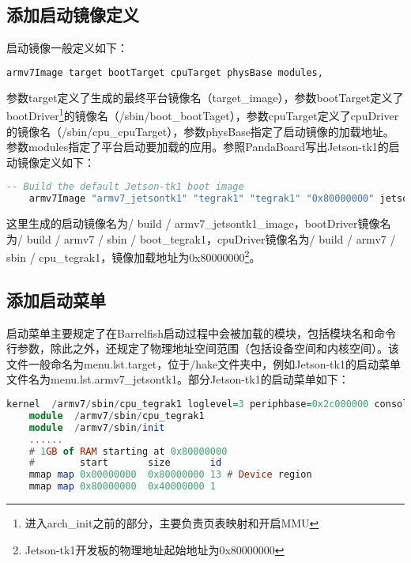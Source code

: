 \documentclass[a4paper, 12pt]{report}
\begin{document}
    \subsection{添加启动镜像定义}
    
    启动镜像一般定义如下：
    \begin{lstlisting}[language = Haskell]
    armv7Image target bootTarget cpuTarget physBase modules,
    \end{lstlisting}
    
    参数target定义了生成的最终平台镜像名（target\_image），参数bootTarget定义了bootDriver\footnote{进入arch\_init之前的部分，主要负责页表映射和开启MMU}的镜像名（/sbin/boot\_bootTaget），参数cpuTarget定义了cpuDriver的镜像名（/sbin/cpu\_cpuTarget），参数physBase指定了启动镜像的加载地址。参数modules指定了平台启动要加载的应用。参照PandaBoard写出Jetson-tk1的启动镜像定义如下：
    
    \begin{lstlisting}[language = Haskell]
    -- Build the default Jetson-tk1 boot image
    armv7Image "armv7_jetsontk1" "tegrak1" "tegrak1" "0x80000000" jetsontk1Modules_A15,
    \end{lstlisting}
    
    这里生成的启动镜像名为/ build / armv7\_jetsontk1\_image，bootDriver镜像名为/ build / armv7 / sbin / boot\_tegrak1，cpuDriver镜像名为/ build / armv7 / sbin / cpu\_tegrak1，镜像加载地址为0x80000000\footnote{Jetson-tk1开发板的物理地址起始地址为0x80000000}。
    
    \subsection{添加启动菜单}
    
    启动菜单主要规定了在Barrelfish启动过程中会被加载的模块，包括模块名和命令行参数，除此之外，还规定了物理地址空间范围（包括设备空间和内核空间）。该文件一般命名为menu.lst.target，位于/hake文件夹中，例如Jetson-tk1的启动菜单文件名为menu.lst.armv7\_jetsontk1。部分Jetson-tk1的启动菜单如下：
    
    \begin{lstlisting}[language = Haskell]
    kernel  /armv7/sbin/cpu_tegrak1 loglevel=3 periphbase=0x2c000000 consolePort=3
    module  /armv7/sbin/cpu_tegrak1
    module  /armv7/sbin/init
    ......
    # 1GB of RAM starting at 0x80000000
    #        start       size       id
    mmap map 0x00000000  0x80000000 13 # Device region
    mmap map 0x80000000  0x40000000 1
    \end{lstlisting}
    
\end{document}
